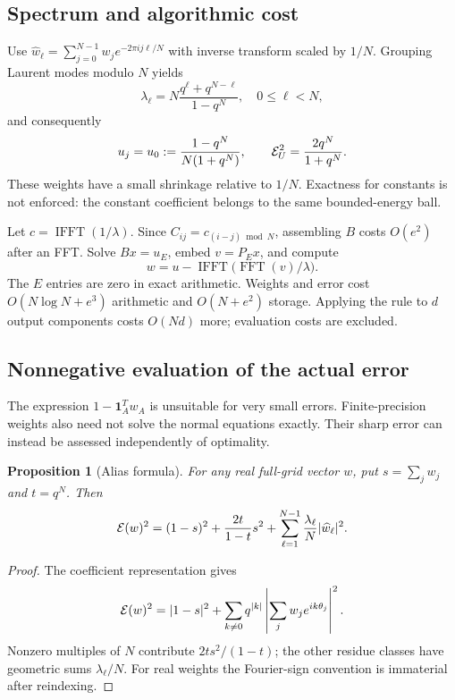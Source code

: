 \documentclass[11pt]{article}
\newtheorem{proposition}[theorem]{Proposition}
\newcommand{\one}{\boldsymbol 1}\newcommand{\norm}[1]{\left\lVert#1\right\rVert}
\begin{document}
\subsection{Spectrum and algorithmic cost}
Use $\widehat w_\ell=\sum_{j=0}^{N-1}w_je^{-2\pi i j\ell/N}$ with inverse transform scaled by $1/N$. Grouping Laurent modes modulo $N$ yields
\begin{equation}
\lambda_\ell=N\frac{q^\ell+q^{N-\ell}}{1-q^N},\quad 0\le\ell<N,
\label{eq:eigenvalues}
\end{equation}
and consequently
\begin{equation}
u_j=u_0:=\frac{1-q^N}{N(1+q^N)},\qquad
\mathcal E_U^2=\frac{2q^N}{1+q^N}.
\label{eq:full}
\end{equation}
These weights have a small shrinkage relative to $1/N$. Exactness for constants is not enforced: the constant coefficient belongs to the same bounded-energy ball.

Let $c=\operatorname{IFFT}(1/\lambda)$. Since $C_{ij}=c_{(i-j)\bmod N}$, assembling $B$ costs $O(e^2)$ after an FFT. Solve $Bx=u_E$, embed $v=P_Ex$, and compute
\begin{equation}
w=u-\operatorname{IFFT}\big(\operatorname{FFT}(v)/\lambda\big).
\label{eq:fft}
\end{equation}
The $E$ entries are zero in exact arithmetic. Weights and error cost $O(N\log N+e^3)$ arithmetic and $O(N+e^2)$ storage. Applying the rule to $d$ output components costs $O(Nd)$ more; evaluation costs are excluded.

\subsection{Nonnegative evaluation of the actual error}
The expression $1-\one_A^Tw_A$ is unsuitable for very small errors. Finite-precision weights also need not solve the normal equations exactly. Their sharp error can instead be assessed independently of optimality.
\begin{proposition}[Alias formula]\label{prop:alias}
For any real full-grid vector $w$, put $s=\sum_jw_j$ and $t=q^N$. Then
\begin{equation}
\mathcal E(w)^2=(1-s)^2+\frac{2t}{1-t}s^2+
\sum_{\ell=1}^{N-1}\frac{\lambda_\ell}{N}|\widehat w_\ell|^2.
\label{eq:alias}
\end{equation}
\end{proposition}
\begin{proof}
The coefficient representation gives
\[
\mathcal E(w)^2=|1-s|^2+\sum_{k\ne0}q^{|k|}
\left|\sum_jw_je^{ik\theta_j}\right|^2.
\]
Nonzero multiples of $N$ contribute $2ts^2/(1-t)$; the other residue classes have geometric sums $\lambda_\ell/N$. For real weights the Fourier-sign convention is immaterial after reindexing.
\end{proof}
\end{document}
